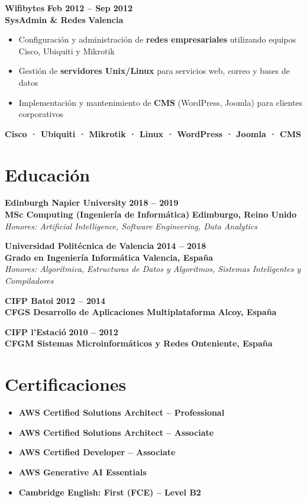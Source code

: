 \documentclass[11pt,a4paper]{article}
\newcommand{\experience}[4]{
    \textbf{\large\color{company}#1} \hfill \textbf{\color{date}#2}\\
    \textbf{\color{role}#3} \hfill \textbf{\color{date}#4}\\
    \vspace{0.3em}
}
\newcommand{\education}[5]{
    \textbf{\large\color{primary}#1} \hfill \textbf{\color{date}#2}\\
    \textbf{\color{secondary}#3} \hfill \textbf{\color{date}#4}\\
    \textit{\color{accent}#5}
}
\newcommand{\badges}[1]{
    \vspace{0.1em}
    \begin{center}
        \small\bfseries\color{accent}#1
    \end{center}
    \vspace{0.1em}
}
\newcommand{\achievement}[1]{
    \item #1
}
\begin{document}
\vspace{0.3em}
\experience{Wifibytes}{Feb 2012 -- Sep 2012}{SysAdmin \& Redes}{Valencia}
\vspace{0.1em}
\begin{itemize}[leftmargin=1em, itemsep=0.2em]
    \achievement{Configuración y administración de \textbf{redes empresariales} utilizando equipos Cisco, Ubiquiti y Mikrotik}
    \achievement{Gestión de \textbf{servidores Unix/Linux} para servicios web, correo y bases de datos}
    \achievement{Implementación y mantenimiento de \textbf{CMS} (WordPress, Joomla) para clientes corporativos}
\end{itemize}
\badges{Cisco · Ubiquiti · Mikrotik · Linux · WordPress · Joomla · CMS}

\section{Educación}

\education{Edinburgh Napier University}{2018 -- 2019}{MSc Computing (Ingeniería de Informática)}{Edimburgo, Reino Unido}{Honores: Artificial Intelligence, Software Engineering, Data Analytics}

\education{Universidad Politécnica de Valencia}{2014 -- 2018}{Grado en Ingeniería Informática}{Valencia, España}{Honores: Algorítmica, Estructuras de Datos y Algoritmos, Sistemas Inteligentes y Compiladores}

\education{CIFP Batoi}{2012 -- 2014}{CFGS Desarrollo de Aplicaciones Multiplataforma}{Alcoy, España}{}

\education{CIFP l'Estació}{2010 -- 2012}{CFGM Sistemas Microinformáticos y Redes}{Onteniente, España}{}

\section{Certificaciones}

\begin{itemize}[leftmargin=1em, itemsep=0.3em]
    \item \textbf{AWS Certified Solutions Architect -- Professional} \hfill {\color{accent}\faAws}
    \item \textbf{AWS Certified Solutions Architect -- Associate} \hfill {\color{accent}\faAws}
    \item \textbf{AWS Certified Developer -- Associate} \hfill {\color{accent}\faAws}
    \item \textbf{AWS Generative AI Essentials} \hfill {\color{accent}\faAws}
    \item \textbf{Cambridge English: First (FCE) -- Level B2} \hfill {\color{accent}\faGraduationCap}
\end{itemize}
\end{document}
